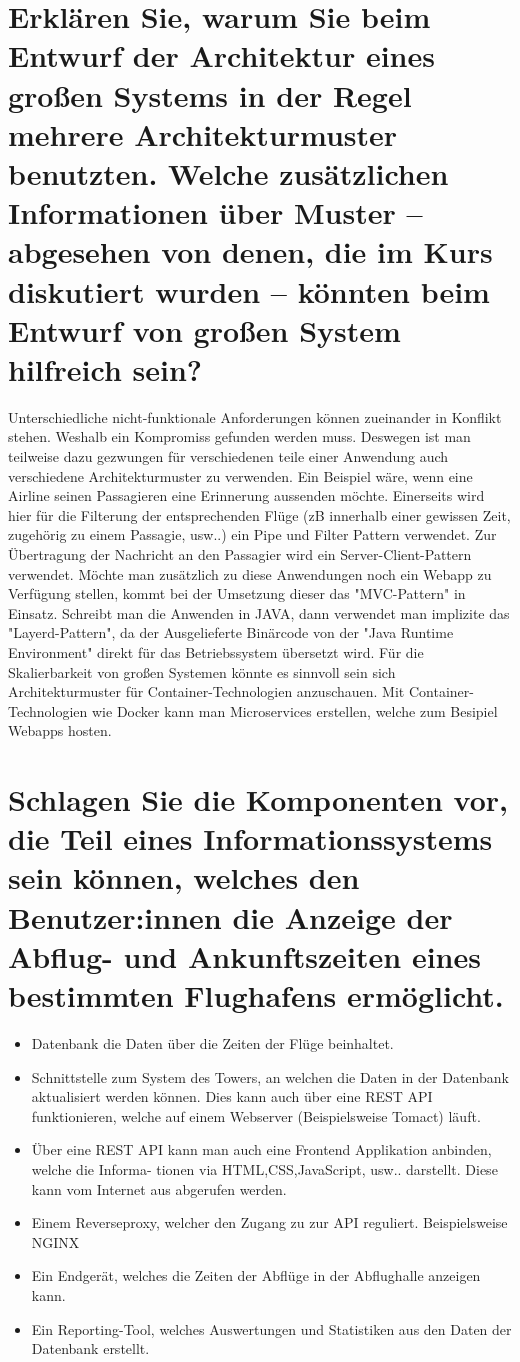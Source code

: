 \documentclass[12pt]{article}
\begin{document}
 \section{Erklären Sie, warum Sie beim Entwurf der Architektur eines großen Systems in der Regel mehrere Architekturmuster benutzten. Welche zusätzlichen Informationen über Muster – abgesehen von denen, die im Kurs diskutiert wurden – könnten beim Entwurf von großen System hilfreich sein?}
Unterschiedliche nicht-funktionale Anforderungen können zueinander in Konflikt stehen. Weshalb ein Kompromiss gefunden werden muss. Deswegen ist man teilweise dazu gezwungen für verschiedenen teile einer Anwendung auch verschiedene Architekturmuster zu verwenden. Ein Beispiel wäre, wenn eine Airline seinen Passagieren eine Erinnerung aussenden möchte. Einerseits wird hier für die Filterung der entsprechenden Flüge (zB innerhalb einer gewissen Zeit, zugehörig zu einem Passagie, usw..) ein Pipe und Filter Pattern verwendet. Zur Übertragung der Nachricht an den Passagier wird ein Server-Client-Pattern verwendet. Möchte man zusätzlich zu diese Anwendungen noch ein Webapp zu Verfügung stellen, kommt bei der Umsetzung dieser das "MVC-Pattern" in Einsatz. Schreibt man die Anwenden in JAVA, dann verwendet man implizite das "Layerd-Pattern", da der Ausgelieferte Binärcode von der "Java Runtime Environment" direkt für das Betriebssystem übersetzt wird. Für die Skalierbarkeit von großen Systemen könnte es sinnvoll sein sich Architekturmuster für Container-Technologien anzuschauen. Mit Container-Technologien wie Docker kann man Microservices erstellen, welche zum Besipiel Webapps hosten.
\section{Schlagen Sie die Komponenten vor, die Teil eines Informationssystems sein können, welches den Benutzer:innen die Anzeige der Abflug- und Ankunftszeiten eines bestimmten Flughafens ermöglicht.}
\begin{itemize}
 \item Datenbank die Daten über die Zeiten der Flüge beinhaltet.
 \item Schnittstelle zum System des Towers, an welchen die Daten in der Datenbank aktualisiert werden können. Dies kann auch über eine REST API funktionieren, welche auf einem Webserver (Beispielsweise Tomact) läuft.
 \item Über eine REST API kann man auch eine Frontend Applikation anbinden, welche die Informa- tionen via HTML,CSS,JavaScript, usw.. darstellt. Diese kann vom Internet aus abgerufen werden.
 \item Einem Reverseproxy, welcher den Zugang zu zur API reguliert. Beispielsweise NGINX
 \item Ein Endgerät, welches die Zeiten der Abflüge in der Abflughalle anzeigen kann.
 \item Ein Reporting-Tool, welches Auswertungen und Statistiken aus den Daten der Datenbank erstellt.
\end{itemize}
\pagebreak
\end{document}
